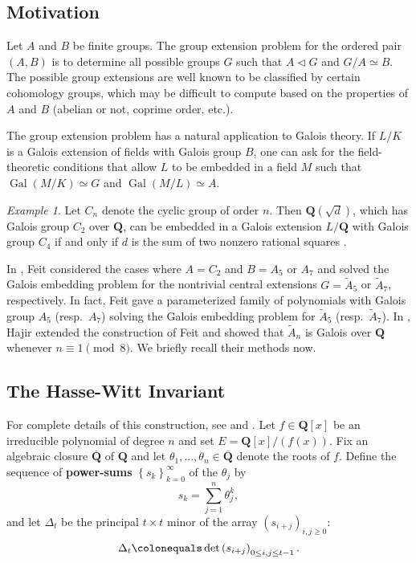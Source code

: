 \documentclass{amsart}
\newcommand{\Gal}{\operatorname{Gal}}
\newcommand{\Q}{\mathbf{Q}}
\newcommand{\ddef}{\colonequals}
\theoremstyle{plain}
\theoremstyle{remark}
\newtheorem{exm}[equation]{Example}
\begin{document}
\subsection{Motivation}

Let $A$ and $B$ be finite groups.  The group extension problem for the ordered pair $(A,B)$ is to determine all possible groups $G$ such that $A \vartriangleleft G$ and $G/A \simeq B$. The possible group extensions are well known to be classified by certain cohomology groups, which may be difficult to compute based on the properties of $A$ and $B$ (abelian or not, coprime order, etc.).   

The group extension problem has a natural application to Galois theory.  If $L/K$ is a Galois extension of fields with Galois group $B$, one can ask for the field-theoretic conditions that allow $L$ to be embedded in a field $M$ such that $\Gal(M/K) \simeq G$ and $\Gal(M/L) \simeq A$.

\begin{exm}
Let $C_n$ denote the cyclic group of order $n$.  Then $\Q(\sqrt{d})$, which has Galois group $C_2$ over $\Q$, can be embedded in a Galois extension $L/\Q$ with Galois group $C_4$ if and only if $d$ is the sum of two nonzero rational squares \cite[Thm.~1.2.4]{serre}.
\end{exm}

In \cite{feit}, Feit considered the cases where $A = C_2$ and $B = A_5$ or $A_7$ and solved the Galois embedding problem for the nontrivial central extensions $G = \widetilde{A}_5$ or $\widetilde{A}_7$, respectively.  In fact, Feit gave a parameterized family of polynomials with Galois group $A_5$ (resp.~$A_7$) solving the Galois embedding problem for $\widetilde{A}_5$ (resp.~$\widetilde{A}_7$).   In \cite{hajir}, Hajir extended the construction of Feit and showed that $\widetilde{A}_n$ is Galois over  $\Q$ whenever $n \equiv 1 \pmod{8}$.  We briefly recall their methods now.

\subsection{The Hasse-Witt Invariant} For complete details of this construction, see \cite[\S 2,3]{feit} and \cite{serre}.  Let $f \in \Q[x]$ be an irreducible polynomial of degree $n$ and set $E = \Q[x]/(f(x))$.  Fix an algebraic closure $\overline{\Q}$ of $\Q$ and let $\theta_1,\dots,\theta_n \in \overline{\Q}$ denote the roots of $f$.   Define the sequence of \textbf{power-sums} $\left\{s_k \right\}_{k=0}^\infty$ of the $\theta_j$  by 
\[
s_k = \sum_{j=1}^n \theta_j^k, 
\]
and let $\Delta_{t}$ be the principal $t \times t$ minor of the array $(s_{i+j})_{i,j \geq 0}$:
\begin{align}  \label{feit_minor}
\Delta_{t} \ddef \det \left(s_{i+j}\right)_{0 \leq i,j \leq t-1}.
\end{align}
\end{document}

